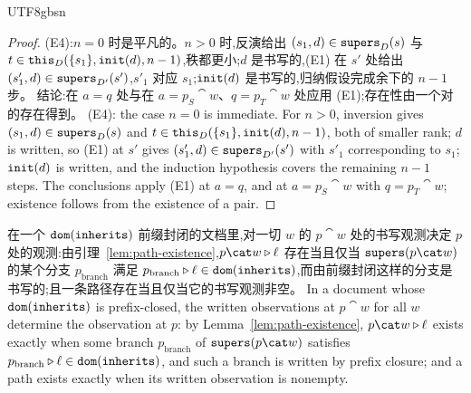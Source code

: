 \begin{CJK*}{UTF8}{gbsn}
\begin{proof}
\ifPaperChinese
(E4):$n = 0$ 时是平凡的。$n > 0$ 时,反演给出 $(s_1, d) \in \mathtt{supers}_D(s)$ 与 $t \in \mathtt{this}_D(\{s_1\}, \mathtt{init}(d), n - 1)$,秩都更小;$d$ 是书写的,(E1) 在 $s'$ 处给出 $(s'_1, d) \in \mathtt{supers}_{D'}(s')$,$s'_1$ 对应 $s_1$;$\mathtt{init}(d)$ 是书写的,归纳假设完成余下的 $n - 1$ 步。
结论:在 $a = q$ 处与在 $a = p_S \cat w$、$q = p_T \cat w$ 处应用 (E1);存在性由一个对的存在得到。
\else
(E4): the case $n = 0$ is immediate. For $n > 0$, inversion gives $(s_1, d) \in \mathtt{supers}_D(s)$ and
$t \in \mathtt{this}_D(\{s_1\}, \mathtt{init}(d), n - 1)$, both of smaller rank; $d$ is written, so (E1) at $s'$ gives
$(s'_1, d) \in \mathtt{supers}_{D'}(s')$ with $s'_1$ corresponding to $s_1$; $\mathtt{init}(d)$ is written, and the
induction hypothesis covers the remaining $n - 1$ steps.
The conclusions apply (E1) at $a = q$, and at $a = p_S \cat w$ with $q = p_T \cat w$; existence
follows from the existence of a pair.
\fi
\end{proof}

\ifPaperChinese
在一个 $\mathtt{dom}(\mathtt{inherits})$ 前缀封闭的文档里,对一切 $w$ 的 $p \cat w$ 处的书写观测决定 $p$ 处的观测:由引理~\ref{lem:path-existence},$p \cat w \snoc \ell$ 存在当且仅当 $\supers(p \cat w)$ 的某个分支 $p_{\mathrm{branch}}$ 满足 $p_{\mathrm{branch}} \mathbin{\triangleright} \ell \in \mathtt{dom}(\mathtt{inherits})$,而由前缀封闭这样的分支是书写的;且一条路径存在当且仅当它的书写观测非空。
\else
In
a document whose $\mathtt{dom}(\mathtt{inherits})$ is prefix-closed, the written observations at $p \cat w$ for all $w$
determine the observation at $p$: by Lemma~\ref{lem:path-existence}, $p \cat w \snoc \ell$ exists exactly
when some branch $p_{\mathrm{branch}}$ of $\supers(p \cat w)$ satisfies
$p_{\mathrm{branch}} \mathbin{\triangleright} \ell \in \mathtt{dom}(\mathtt{inherits})$, and such a branch is written by prefix closure; and
a path exists exactly when its written observation is nonempty.
\fi




\end{CJK*}
